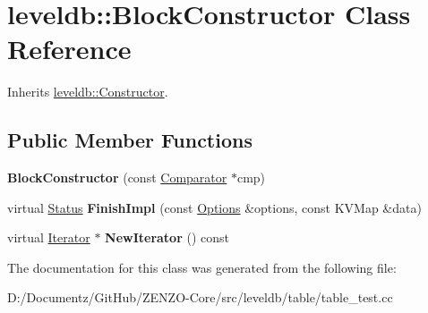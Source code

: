 \hypertarget{classleveldb_1_1_block_constructor}{}\section{leveldb\+::Block\+Constructor Class Reference}
\label{classleveldb_1_1_block_constructor}


Inherits \mbox{\hyperlink{classleveldb_1_1_constructor}{leveldb\+::\+Constructor}}.

\subsection*{Public Member Functions}
\begin{DoxyCompactItemize}
\item 
\mbox{\label{classleveldb_1_1_block_constructor_a1f89523b9e688d6525da80d5595bee4c}} 
{\bfseries Block\+Constructor} (const \mbox{\hyperlink{structleveldb_1_1_comparator}{Comparator}} $\ast$cmp)
\item 
\mbox{\label{classleveldb_1_1_block_constructor_ae3f38f0769d34cb7d80776b8249f48ae}} 
virtual \mbox{\hyperlink{classleveldb_1_1_status}{Status}} {\bfseries Finish\+Impl} (const \mbox{\hyperlink{structleveldb_1_1_options}{Options}} \&options, const K\+V\+Map \&data)
\item 
\mbox{\label{classleveldb_1_1_block_constructor_ae1eda84c2235ed692050910218aa9e3e}} 
virtual \mbox{\hyperlink{classleveldb_1_1_iterator}{Iterator}} $\ast$ {\bfseries New\+Iterator} () const
\end{DoxyCompactItemize}


The documentation for this class was generated from the following file\+:\begin{DoxyCompactItemize}
\item 
D\+:/\+Documentz/\+Git\+Hub/\+Z\+E\+N\+Z\+O-\/\+Core/src/leveldb/table/table\+\_\+test.\+cc\end{DoxyCompactItemize}
